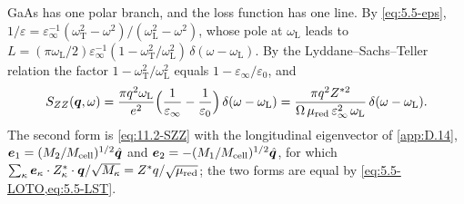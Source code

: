 GaAs has one polar branch, and the loss function has one line. By \cref{eq:5.5-eps}, $1/\varepsilon = \varepsilon_\infty^{-1}(\omega_{\mathrm{T}}^2 - \omega^2)/(\omega_{\mathrm{L}}^2 - \omega^2)$, whose pole at $\omega_{\mathrm{L}}$ leads to $L = (\pi\omega_{\mathrm{L}}/2)\varepsilon_\infty^{-1}(1 - \omega_{\mathrm{T}}^2/\omega_{\mathrm{L}}^2)\,\delta(\omega - \omega_{\mathrm{L}})$. By the Lyddane--Sachs--Teller relation the factor $1 - \omega_{\mathrm{T}}^2/\omega_{\mathrm{L}}^2$ equals $1 - \varepsilon_\infty/\varepsilon_0$, and
\begin{equation}
  S_{ZZ}(\bm{q},\omega) = \frac{\pi q^2\omega_{\mathrm{L}}}{e^2}\Bigl(\frac{1}{\varepsilon_\infty} - \frac{1}{\varepsilon_0}\Bigr)\,\delta(\omega - \omega_{\mathrm{L}})
  = \frac{\pi q^2Z^{*2}}{\Omega\,\mu_{\mathrm{red}}\,\varepsilon_\infty^2\,\omega_{\mathrm{L}}}\,\delta(\omega - \omega_{\mathrm{L}}) .
  \label{eq:11.2-onebranch}
\end{equation}
The second form is \cref{eq:11.2-SZZ} with the longitudinal eigenvector of \cref{app:D.14}, $\bm{e}_1 = (M_2/M_{\mathrm{cell}})^{1/2}\hat{\bm{q}}$ and $\bm{e}_2 = -(M_1/M_{\mathrm{cell}})^{1/2}\hat{\bm{q}}$, for which $\sum_\kappa\bm{e}_\kappa\cdot Z^*_\kappa\cdot\bm{q}/\sqrt{M_\kappa} = Z^*q/\sqrt{\mu_{\mathrm{red}}}$; the two forms are equal by \cref{eq:5.5-LOTO,eq:5.5-LST}.

